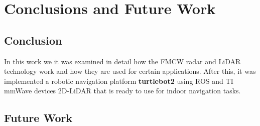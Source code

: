 \chapter{Conclusions and Future Work}


\section{Conclusion}
In this work we it was examined in detail how the \ac{FMCW} \ac{radar} and \ac{LiDAR} technology work and how they are used for certain applications. After this, it was implemented a robotic navigation platform \textbf{turtlebot2} using \ac{ROS} and \ac{TI} \ac{mmWave} devices 2D-\ac{LiDAR} that is ready to use for indoor navigation tasks.
\section{Future Work}
